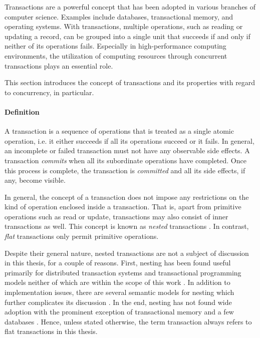 Transactions are a powerful concept that has been adopted in various branches of
computer science. Examples include databases, transactional memory, and
operating systems. With transactions, multiple operations, such as reading or
updating a record, can be grouped into a single unit that succeeds if and only
if neither of its operations fails. Especially in high-performance computing
environments, the utilization of computing resources through concurrent
transactions plays an essential role.

This section introduces the concept of transactions and its properties with
regard to concurrency, in particular.

\paragraph{Definition}

A transaction is a sequence of operations that is treated as a single atomic
operation, i.e. it either succeeds if all its operations succeed or it fails.
In general, an incomplete or failed transaction must not have any observable
side effects. A transaction \emph{commits} when all its subordinate operations
have completed. Once this process is complete, the transaction is
\emph{committed} and all its side effects, if any, become visible.

In general, the concept of a transaction does not impose any restrictions on the
kind of operation enclosed inside a transaction. That is, apart from primitive
operations such as read or update, transactions may also consist of inner
transactions as well. This concept is known as \emph{nested} transactions
\cite{gray1981transaction}. In contrast, \emph{flat} transactions only permit
primitive operations.

Despite their general nature, nested transactions are not a subject of
discussion in this thesis, for a couple of reasons. First, nesting has been
found useful primarily for distributed transaction systems and transactional
programming models neither of which are within the scope of this work
\cite{moss1981nested, moss2006open}. In addition to implementation issues, there
are several semantic models for nesting which further complicates its discussion
\cite{harder1993concurrency, weikum1992concepts}. In the end, nesting has not
found wide adoption with the prominent exception of transactional memory
\cite{moss2006nested, moravan2006supporting, jacobi2012transactional} and a few
databases \cite{olson1999berkeley}. Hence, unless stated otherwise, the term
transaction always refers to flat transactions in this thesis.

